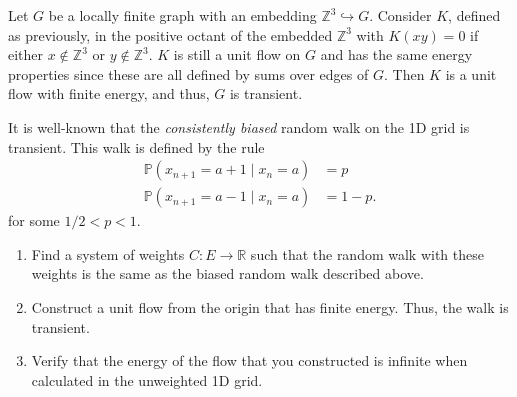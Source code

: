 \documentclass[12 pt, letterpaper]{hmcpset}
\begin{document}
\begin{solution}
	Let $G$ be a locally finite graph with an embedding $\mathbb{Z}^{3} \hookrightarrow G$. Consider $K$, defined as previously, in the positive octant of the embedded $\mathbb{Z}^{3}$ with $K(xy) = 0$ if either $x \notin \mathbb{Z}^{3}$ or $y \notin \mathbb{Z}^{3}$. $K$ is still a unit flow on $G$ and has the same energy properties since these are all defined by sums over edges of $G$. Then $K$ is a unit flow with finite energy, and thus, $G$ is transient. 
\end{solution}

\pagebreak


\begin{problem}[51.]
	It is well-known that the \emph{consistently biased} random walk on the 1D grid is transient. This walk is defined by the rule
	\begin{align*}
		\mathbb{P}(x_{n + 1} = a + 1 \mid x_{n} = a) & = p \\
		\mathbb{P}(x_{n + 1} = a - 1 \mid x_{n} = a) & = 1 - p.
	\end{align*}
	for some $1 / 2 < p < 1$.
	\begin{enumerate}
		\item Find a system of weights $C : E \to \mathbb{R}$ such that the random walk with these weights is the same as the biased random walk described above.

		\item Construct a unit flow from the origin that has finite energy. Thus, the walk is transient.

		\item Verify that the energy of the flow that you constructed is infinite when calculated in the unweighted 1D grid.
	\end{enumerate}
\end{problem}
\end{document}
